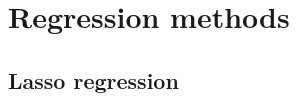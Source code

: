 \documentclass[main.tex]{subfiles}
\begin{document}
\section{Regression methods}

\subsection{Lasso regression}
\end{document}

